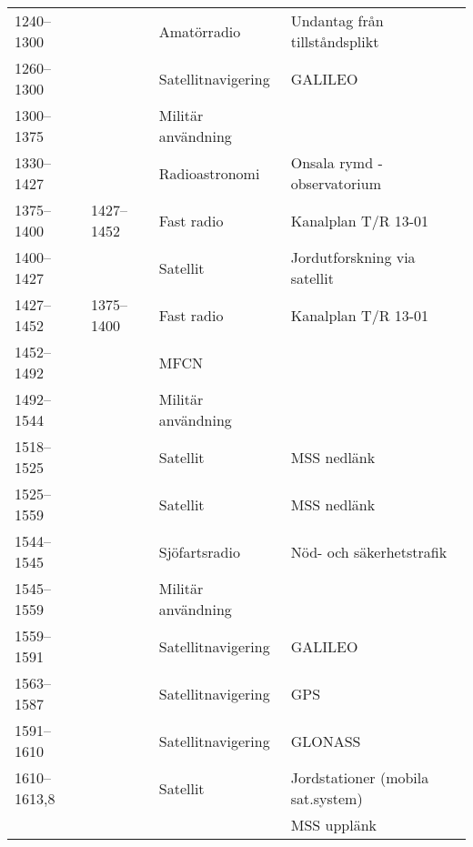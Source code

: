 \begin{landscape}
\begin{longtable}{llll}
	1240--1300         &                    & Amatörradio             & Undantag från tillståndsplikt         \\
	1260--1300         &                    & Satellitnavigering      & GALILEO                               \\
	1300--1375         &                    & Militär användning      &                                       \\
	1330--1427         &                    & Radioastronomi          & Onsala rymd - observatorium           \\
	1375--1400         & 1427--1452         & Fast radio              & Kanalplan T/R 13-01                   \\
	1400--1427         &                    & Satellit                & Jordutforskning via satellit          \\
	1427--1452         & 1375--1400         & Fast radio              & Kanalplan T/R 13-01                   \\
	1452--1492         &                    & MFCN                    &                                       \\
	1492--1544         &                    & Militär användning      &                                       \\
	1518--1525         &                    & Satellit                & MSS nedlänk                           \\
	1525--1559         &                    & Satellit                & MSS nedlänk                           \\
	1544--1545         &                    & Sjöfartsradio           & Nöd- och säkerhetstrafik              \\
	1545--1559         &                    & Militär användning      &                                       \\
	1559--1591         &                    & Satellitnavigering      & GALILEO                               \\
	1563--1587         &                    & Satellitnavigering      & GPS                                   \\
	1591--1610         &                    & Satellitnavigering      & GLONASS                               \\
	1610--1613,8       &                    & Satellit                & Jordstationer (mobila sat.system)     \\
	                   &                    &                         & MSS upplänk                           \\

\end{longtable}
\end{landscape}

